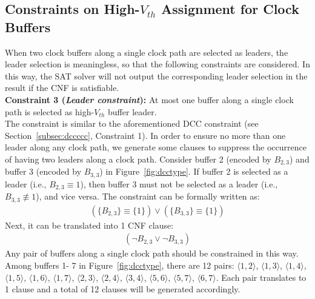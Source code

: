 \subsection{Constraints on High-$V_{th}$ Assignment for Clock Buffers}



When two clock buffers along a single clock path are selected as leaders, the leader selection is meaningless, so that the following constraints are considered. In this way, the SAT solver will not output the corresponding leader selection in the result if the CNF is satisfiable.\\

\noindent \textbf{Constraint 3 (\textit{Leader constraint}):} At most one buffer along a single clock path is selected as high-$V_{th}$ buffer leader.\\

The constraint is similar to the aforementioned DCC constraint (see Section~\ref{subsec:dccccc}, Constraint 1). In order to ensure no more than one leader along any clock path, we generate some clauses to suppress the occurrence of having two leaders along a clock path. Consider buffer 2 (encoded by {\fontsize{9}{10}$B_{2,3}$}) and buffer 3 (encoded by {\fontsize{9}{10}$B_{3,3}$}) in Figure~\ref{fig:dcctype}. If buffer 2 is selected as a leader (i.e., {\fontsize{9}{10}${B_{2,3}} \equiv {1}$}), then buffer 3 must not be selected as a leader (i.e., {\fontsize{9}{10}$B_{3,3} \not\equiv {1}$}), and vice versa. The constraint can be formally written as:
{\fontsize{9}{10}
\begin{gather*}
\left(\{B_{2,3}\} \equiv \{1\}\right) \lor \left(\{B_{3,3}\} \equiv \{1\}\right)
\end{gather*}}
Next, it can be translated into 1 CNF clause:
{\fontsize{9}{10}
\begin{equation*}
\begin{split}
(\neg B_{2,3}\lor\neg B_{3,3})
\end{split}
\end{equation*}}
Any pair of buffers along a single clock path should be constrained in this way. Among buffers 1- 7 in Figure~\ref{fig:dcctype}, there are 12 pairs: $\langle1, 2\rangle$, $\langle1, 3\rangle$, $\langle1, 4\rangle$, $\langle1, 5\rangle$, $\langle1, 6\rangle$, $\langle1, 7\rangle$, $\langle2, 3\rangle$, $\langle2, 4\rangle$, $\langle3, 4\rangle$, $\langle5, 6\rangle$, $\langle5, 7\rangle$, $\langle6, 7\rangle$. Each pair translates to 1 clause and a total of 12 clauses will be generated accordingly.

